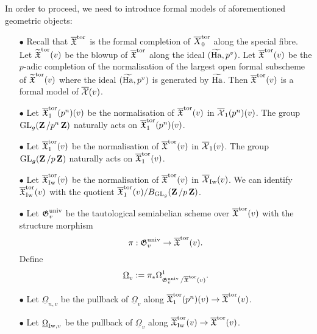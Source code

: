 In order to proceed, we need to introduce formal models of aforementioned geometric objects: 
\begin{enumerate}
\item[$\bullet$] Recall that $\overline{\frakX}^{\tor}$ is the formal completion of $\overline{X}_0^{\tor}$ along the special fibre. Let $\widetilde{\frakX}^{\tor}(v)$ be the blowup of $\overline{\frakX}^{\tor}$ along the ideal $(\widetilde{\Ha}, p^v)$. Let $\overline{\frakX}^{\tor}(v)$ be the $p$-adic completion of the normalisation of the largest open formal subscheme of $\widetilde{\frakX}^{\tor}(v)$ where the ideal $(\widetilde{\Ha}, p^v)$ is generated by $\widetilde{\Ha}$. Then $\overline{\frakX}^{\tor}(v)$ is a formal model of $\overline{\calX}(v)$. 
\item[$\bullet$] Let $\overline{\frakX}^{\tor}_1(p^n)(v)$ be the normalisation of $\overline{\frakX}^{\tor}(v)$ in $\overline{\calX}_1(p^n)(v)$. The group $\GL_g(\Z/p^n\Z)$ naturally acts on $\overline{\frakX}^{\tor}_1(p^n)(v)$.
\item[$\bullet$] Let $\overline{\frakX}^{\tor}_1(v)$ be the normalisation of $\overline{\frakX}^{\tor}(v)$ in $\overline{\calX}_1(v)$. The group $\GL_g(\Z/p\Z)$ naturally acts on $\overline{\frakX}^{\tor}_1(v)$.
\item[$\bullet$] Let $\overline{\frakX}_{\Iw}^{\tor}(v)$ be the normalisation of $\overline{\frakX}^{\tor}(v)$ in $\overline{\calX}_{\Iw}(v)$. We can identify $\overline{\frakX}_{\Iw}^{\tor}(v)$ with the quotient $\overline{\frakX}_1^{\tor}(v)/B_{\GL_g}(\Z/p\Z)$.
\item[$\bullet$] Let $\frakG_v^{\univ}$ be the tautological semiabelian scheme over $\overline{\frakX}^{\tor}(v)$ with the structure morphism 
$$\pi: \frakG_v^{\univ}\rightarrow \overline{\frakX}^{\tor}(v).$$
Define 
$$\underline{\Omega}_v:=\pi_*\Omega^1_{\frakG_v^{\univ}/\overline{\frakX}^{\tor}(v)}.$$
\item[$\bullet$] Let $\underline{\Omega}_{n,v}$ be the pullback of $\underline{\Omega}_v$ along $\overline{\frakX}^{\tor}_1(p^n)(v)\rightarrow \overline{\frakX}^{\tor}(v)$. 
\item[$\bullet$] Let $\underline{\Omega}_{\Iw,v}$ be the pullback of $\underline{\Omega}_v$ along $\overline{\frakX}^{\tor}_{\Iw}(v)\rightarrow \overline{\frakX}^{\tor}(v)$.
\end{enumerate}


